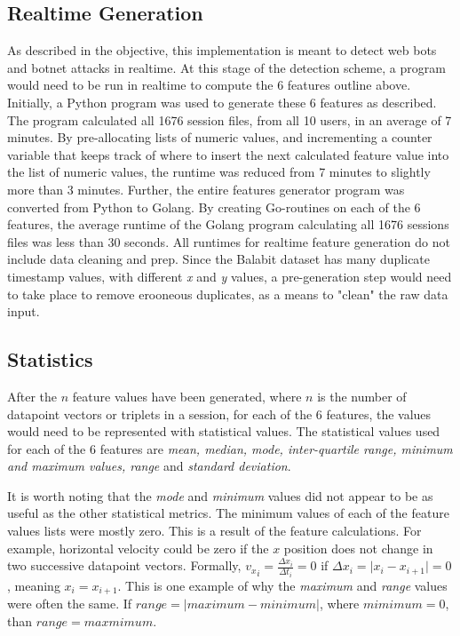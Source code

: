 \subsection{Realtime Generation}\label{subsec:realtime-generation}
As described in the objective, this implementation is meant to detect web bots and botnet attacks in realtime.
At this stage of the detection scheme, a program would need to be run in realtime to compute the 6 features outline above.
Initially, a Python program was used to generate these 6 features as described.
The program calculated all 1676 session files, from all 10 users, in an average of 7 minutes.
By pre-allocating lists of numeric values, and incrementing a counter variable that keeps track of where to insert the next calculated feature value into the list of numeric values, the runtime was reduced from 7 minutes to slightly more than 3 minutes.
Further, the entire features generator program was converted from Python to Golang.
By creating Go-routines on each of the 6 features, the average runtime of the Golang program calculating all 1676 sessions files was less than 30 seconds.
All runtimes for realtime feature generation do not include data cleaning and prep.
Since the Balabit dataset has many duplicate timestamp values, with different \textit{x} and \textit{y} values, a pre-generation step would need to take place to remove erooneous duplicates, as a means to "clean" the raw data input.

\subsection{Statistics}\label{subsec:statistics}
After the $n$ feature values have been generated, where $n$ is the number of datapoint vectors or triplets in a session, for each of the 6 features, the values would need to be represented with statistical values.
The statistical values used for each of the 6 features are \textit{mean, median, mode, inter-quartile range, minimum and maximum values, range} and \textit{standard deviation}.

It is worth noting that the \textit{mode} and \textit{minimum} values did not appear to be as useful as the other statistical metrics.
The minimum values of each of the feature values lists were mostly zero.
This is a result of the feature calculations.
For example, horizontal velocity could be zero if the $x$ position does not change in two successive datapoint vectors.
Formally, ${v_x}_i = \frac{\Delta x_i}{\Delta t_i} = 0$ if $\Delta x_i = \lvert x_i - x_{i+1} \rvert = 0$, meaning $x_i = x_{i+1}$.
This is one example of why the \textit{maximum} and \textit{range} values were often the same.
If $range = \vert maximum - minimum \rvert$, where $mimimum = 0$, than $range = maxmimum$.
